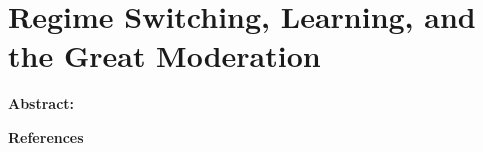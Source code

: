 \chapter{Regime Switching, Learning, and the Great Moderation}

\noindent \textbf{Abstract:}




\newpage
\noindent\large\textbf{References}\vspace{-5pc}\normalsize

\newpage

